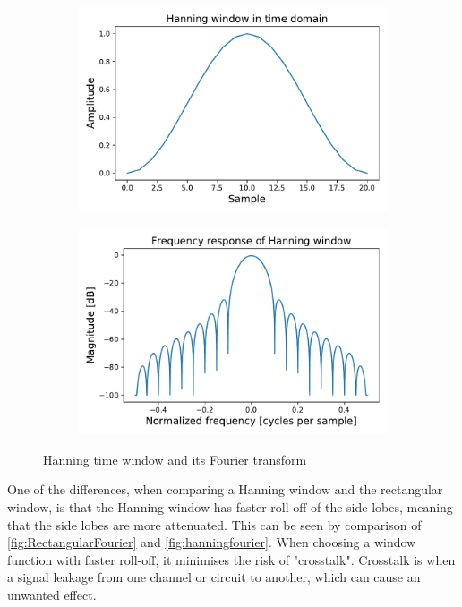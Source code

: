 \begin{figure}[H]
    \centering
    \begin{subfigure}[b]{.49\textwidth}
        \centering
        \includegraphics[width=\textwidth]{figures/HanningTime.pdf}
        \caption{}
        \label{fig:hanningtime}
    \end{subfigure}
    \begin{subfigure}[b]{.49\textwidth}
        \centering
        \includegraphics[width=\textwidth]{figures/HanningFourier.pdf}
        \caption{}
        \label{fig:hanningfourier}
    \end{subfigure}
\caption{Hanning time window and its Fourier transform}
\label{fig: Hanning}
\end{figure}
One of the differences, when comparing a Hanning window and the rectangular window, is that the Hanning window has faster roll-off of the side lobes, meaning that the side lobes are more attenuated. This can be seen by comparison of \autoref{fig:RectangularFourier} and \autoref{fig:hanningfourier}. When choosing a window function with faster roll-off, it minimises the risk of "crosstalk". Crosstalk is when a signal leakage from one channel or circuit to another, which can cause an unwanted effect. \\

